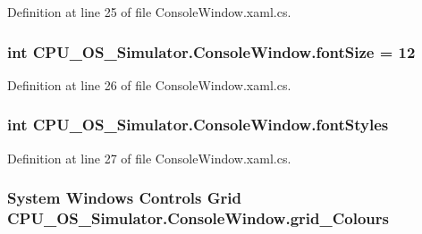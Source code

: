 Definition at line 25 of file Console\+Window.\+xaml.\+cs.

\hypertarget{class_c_p_u___o_s___simulator_1_1_console_window_a0c319b98b649d11ffa185590e771cbb1}{}
\subsubsection[{font\+Size}]{\setlength{\rightskip}{0pt plus 5cm}int C\+P\+U\+\_\+\+O\+S\+\_\+\+Simulator.\+Console\+Window.\+font\+Size = 12\hspace{0.3cm}{\ttfamily [private]}}\label{class_c_p_u___o_s___simulator_1_1_console_window_a0c319b98b649d11ffa185590e771cbb1}


Definition at line 26 of file Console\+Window.\+xaml.\+cs.

\hypertarget{class_c_p_u___o_s___simulator_1_1_console_window_abe8a7e3f2f861cd266a24426b2ffbc1c}{}
\subsubsection[{font\+Styles}]{\setlength{\rightskip}{0pt plus 5cm}int C\+P\+U\+\_\+\+O\+S\+\_\+\+Simulator.\+Console\+Window.\+font\+Styles\hspace{0.3cm}{\ttfamily [private]}}\label{class_c_p_u___o_s___simulator_1_1_console_window_abe8a7e3f2f861cd266a24426b2ffbc1c}


Definition at line 27 of file Console\+Window.\+xaml.\+cs.

\hypertarget{class_c_p_u___o_s___simulator_1_1_console_window_a0d262972210c72305e20330f5dda9388}{}
\subsubsection[{grid\+\_\+\+Colours}]{\setlength{\rightskip}{0pt plus 5cm}System Windows Controls Grid C\+P\+U\+\_\+\+O\+S\+\_\+\+Simulator.\+Console\+Window.\+grid\+\_\+\+Colours\hspace{0.3cm}{\ttfamily [package]}}\label{class_c_p_u___o_s___simulator_1_1_console_window_a0d262972210c72305e20330f5dda9388}



